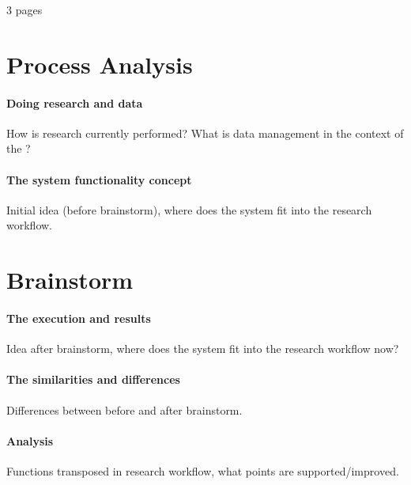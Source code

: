 3 pages

\section{Process Analysis}
\paragraph{Doing research and \project{} data}
How is research currently performed?
What is data management in the context of the \ivfsystem{}?
\paragraph{The system functionality concept}
Initial idea (before brainstorm), where does the system fit into the research workflow.

\section{Brainstorm}
\paragraph{The execution and results}
Idea after brainstorm, where does the system fit into the research workflow now?
\paragraph{The similarities and differences}
Differences between before and after brainstorm.
\paragraph{Analysis}
Functions transposed in research workflow, what points are supported/improved.